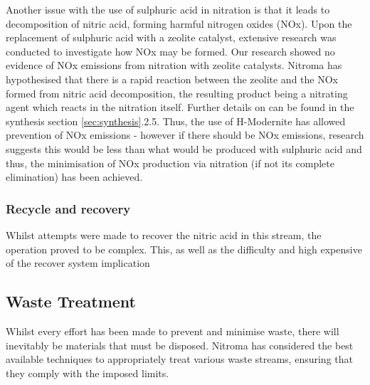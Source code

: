 Another issue with the use of sulphuric acid in nitration is that it leads to decomposition of nitric acid, forming harmful nitrogen oxides (NOx). Upon the replacement of sulphuric acid with a zeolite catalyst, extensive research was conducted to investigate how NOx may be formed. Our research showed no evidence of NOx emissions from nitration with zeolite catalysts. Nitroma has hypothesised that there is a rapid reaction between the zeolite and the NOx formed from nitric acid decomposition, the resulting product being a nitrating agent which reacts in the nitration itself. Further details on can be found in the synthesis section \ref{sec:synthesis}.2.5. Thus, the use of H-Modernite has allowed prevention of NOx emissions - however if there should be NOx emissions, research suggests this would be less than what would be produced with sulphuric acid and thus, the minimisation of NOx production via nitration (if not its complete elimination) has been achieved.  

\subsubsection{Recycle and recovery}


 




Whilst attempts were made to recover the nitric acid in this stream, the operation proved to be complex. This, as well as the difficulty and high expensive of the recover system implication 



\subsection{Waste Treatment}

Whilst every effort has been made to prevent and minimise waste, there will inevitably be materials that must be disposed. Nitroma has considered the best available techniques to appropriately treat various waste streams, ensuring that they comply with the imposed limits.


